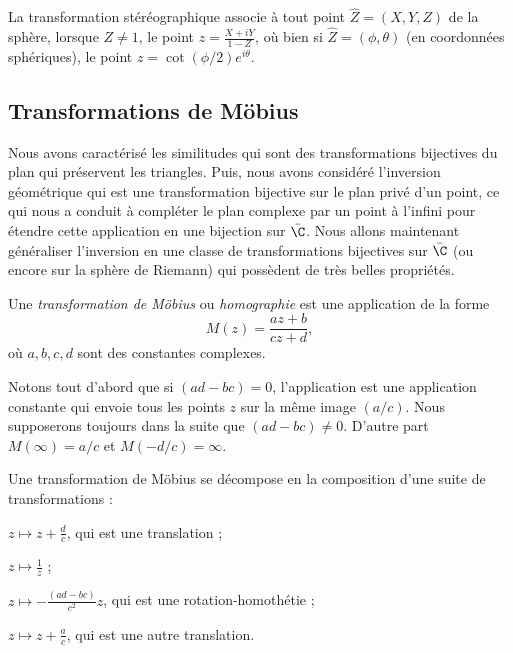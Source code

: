 La transformation stéréographique associe à tout point $\hat{Z}=(X,Y,Z)$ de la sphère, lorsque $Z \neq 1$, le point $z=\frac{X+i Y}{1-Z}$, où bien si $\hat{Z} = (\phi,  \theta)$ (en coordonnées sphériques), le point $z= \cot (\phi/2) e^{i \theta}$.   





\subsection{Transformations de Möbius}

Nous avons caractérisé les similitudes qui sont des transformations bijectives du plan qui préservent les triangles. Puis, nous avons considéré l'inversion géométrique qui est une transformation bijective sur le plan privé d'un point, ce qui nous a conduit à compléter le plan complexe par un point à l'infini pour étendre cette application en une bijection sur $\bar{\C}$. Nous allons maintenant généraliser l'inversion en une classe de transformations bijectives sur $\bar{\C}$ (ou encore sur la sphère de Riemann) qui possèdent de très belles propriétés.

Une \textit{transformation de Möbius} ou \textit{homographie} est une application de la forme 
\[M(z)=\frac{a z +b}{c z +d},\]
où $a,b,c,d$ sont des constantes complexes. 

Notons tout d'abord que si $(ad-bc)=0$, l'application est une application constante qui envoie tous les points $z$ sur la même image $(a/c)$. Nous supposerons toujours dans la suite que $(ad-bc) \neq 0$. D'autre part $M(\infty)=a/c$ et $M(-d/c)=\infty$.

\begin{prop}
Une transformation de Möbius se décompose en la composition d'une suite de transformations :
\begin{MYenumerate}
\item $z \mapsto z +\frac{d}{c}$, qui est une translation ;
\item $z \mapsto \frac{1}{z}$ ;
\item $z \mapsto -\frac{(ad-bc)}{c^2}z$, qui est une rotation-homothétie ;
\item $z \mapsto z +\frac{a}{c}$, qui est une autre translation.
\end{MYenumerate}
\end{prop}

